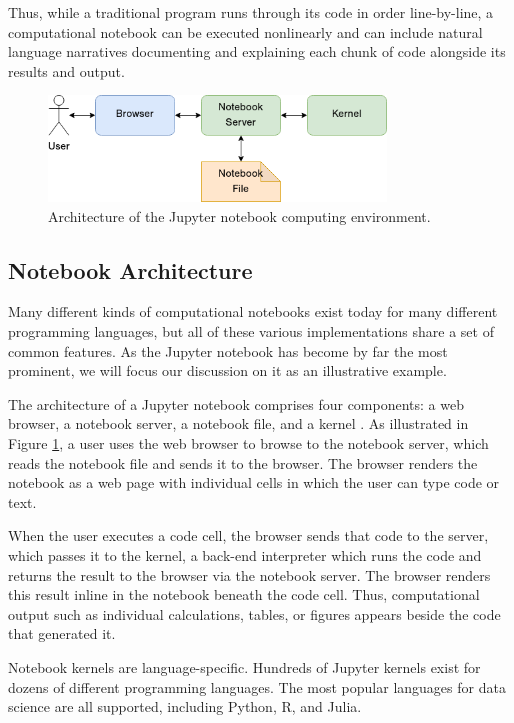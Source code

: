 \documentclass[11pt,letterpaper]{article}
\begin{document}
Thus, while a traditional program runs through its code in order line-by-line, a computational notebook can be executed nonlinearly and can include natural language narratives documenting and explaining each chunk of code alongside its results and output.

\begin{figure}[tbp]
	\centering
	\includegraphics[width=0.8\textwidth]{notebook-architecture.png}
	\caption{Architecture of the Jupyter notebook computing environment.}
	\label{fig:notebook_architecture}
\end{figure}

\subsection{Notebook Architecture}

Many different kinds of computational notebooks exist today for many different programming languages, but all of these various implementations share a set of common features. As the Jupyter notebook has become by far the most prominent, we will focus our discussion on it as an illustrative example.

The architecture of a Jupyter notebook comprises four components: a web browser, a notebook server, a notebook file, and a kernel \citep{kluyver_jupyter_2016}. As illustrated in Figure \ref{fig:notebook_architecture}, a user uses the web browser to browse to the notebook server, which reads the notebook file and sends it to the browser. The browser renders the notebook as a web page with individual cells in which the user can type code or text.

When the user executes a code cell, the browser sends that code to the server, which passes it to the kernel, a back-end interpreter which runs the code and returns the result to the browser via the notebook server. The browser renders this result inline in the notebook beneath the code cell. Thus, computational output such as individual calculations, tables, or figures appears beside the code that generated it.

Notebook kernels are language-specific. Hundreds of Jupyter kernels exist for dozens of different programming languages. The most popular languages for data science are all supported, including Python, R, and Julia.
\end{document}
